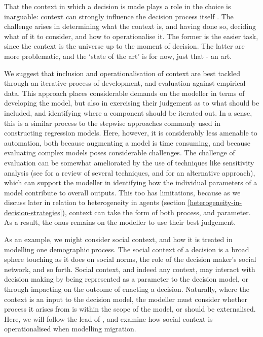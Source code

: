 \documentclass{article}
\begin{document}
That the context in which a decision is made plays a role in the choice is inarguable: context can strongly influence the decision process itself \citep{Ben-Akiva2012}. The challenge arises in determining what the context is, and having done so, deciding what of it to consider, and how to operationalise it. The former is the easier task, since the context is the universe up to the moment of decision. The latter are more problematic, and the `state of the art' is for now, just that - an art. 

We suggest that inclusion and operationalisation of context are best tackled through an iterative process of development, and evaluation against empirical data. This approach places considerable demands on the modeller in terms of developing the model, but also in exercising their judgement as to what should be included, and identifying where a component should be iterated out. In a sense, this is a similar process to the stepwise approaches commonly used in constructing regression models. Here, however, it is considerably less amenable to automation, both because augmenting a model is time consuming, and because evaluating complex models poses considerable challenges. The challenge of evaluation can be somewhat ameliorated by the use of techniques like sensitivity analysis (see \citet{Thiele2014} for a review of several techniques, and \citet{Oakley2004} for an alternative approach), which can support the modeller in identifying how the individual parameters of a model contribute to overall outputs. This too has limitations, because as we discuss later in relation to heterogeneity in agents (section \ref{heterogeneity-in-decision-strategies}), context can take the form of both process, and parameter.
As a result, the onus remains on the modeller to use their best judgement.

As an example, we might consider social context, and how it is treated in modelling one demographic process. The social context of a decision is a broad sphere touching as it does on social norms, the role of the decision maker's social network, and so forth. Social context, and indeed any context, may interact with decision making by being represented as a parameter to the decision model, or through impacting on the outcome of enacting a decision. Naturally, where the context is an input to the decision model, the modeller must consider whether process it arises from is within the scope of the model, or should be externalised.
Here, we will follow the lead of \citet{Klabunde}, and examine how social context is operationalised when modelling migration. 
\end{document}
